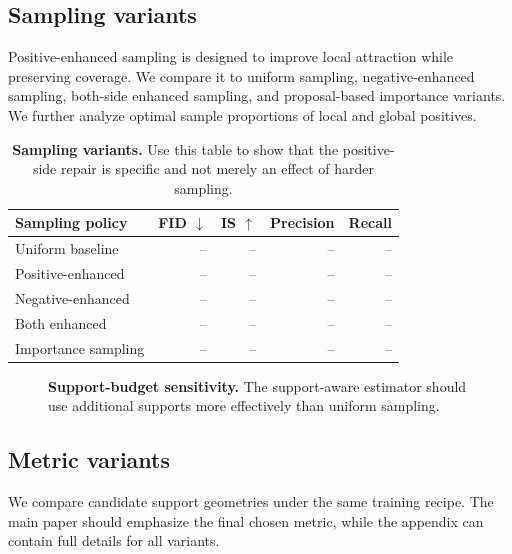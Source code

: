 \documentclass{article}
\newcommand{\placeholderbox}[2]{
\begin{center}
\fbox{
\begin{minipage}[c][#1][c]{0.92\linewidth}
\centering
\textcolor{mlgray}{#2}
\end{minipage}
}
\end{center}
}
\begin{document}
\subsection{Sampling variants}
\label{subsec:sampling_variants}

Positive-enhanced sampling is designed to improve local attraction while preserving coverage.
We compare it to uniform sampling, negative-enhanced sampling, both-side enhanced sampling, and proposal-based importance variants. We further analyze optimal sample proportions of local and global positives. 

\begin{table}[h!]
\centering
\caption{
\textbf{Sampling variants.}
Use this table to show that the positive-side repair is specific and not merely an effect of harder sampling.
}
\label{tab:sampling_variants}
\begin{tabular}{lrrrr}
\toprule
Sampling policy & FID $\downarrow$ & IS $\uparrow$ & Precision & Recall \\
\midrule
Uniform baseline & -- & -- & -- & -- \\
Positive-enhanced & -- & -- & -- & -- \\
Negative-enhanced & -- & -- & -- & -- \\
Both enhanced & -- & -- & -- & -- \\
Importance sampling & -- & -- & -- & -- \\
\bottomrule
\end{tabular}
\end{table}


\begin{figure}[h!]
\centering
\placeholderbox{0.22\textheight}{
Support-budget sensitivity.\\
Diagnostics and/or FID versus number of positives and negatives.
}
\caption{
\textbf{Support-budget sensitivity.}
The support-aware estimator should use additional supports more effectively than uniform sampling.
}
\label{fig:support_budget_sensitivity}
\end{figure}



\subsection{Metric variants}
\label{subsec:metric_variants}

We compare candidate support geometries under the same training recipe.
The main paper should emphasize the final chosen metric, while the appendix can contain full details for all variants.
\end{document}
